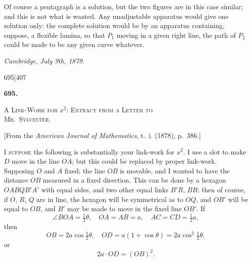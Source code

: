 \documentclass[11pt]{article}
\begin{document}
Of course a pentagraph is a solution, but the two figures are in this case similar; and this is not what is wanted. Any unadjustable apparatus would give one solution only: the complete solution would be by an apparatus containing, suppose, a flexible lamina, so that $P_{1}$ moving in a given right line, the path of $P_{2}$ could be made to be any given curve whatever.

\medskip
\noindent\textit{Cambridge, July 9th, 1879.}

\clearpage
\begin{center}\small 695]\hfill 407\end{center}

\bigskip
\begin{center}\textbf{\large 695.}\end{center}

\bigskip
\begin{center}\textsc{A Link-Work for $x^{2}$: Extract from a Letter to\\ Mr.~Sylvester.}\end{center}

\begin{center}\small [From the \textit{American Journal of Mathematics}, t.~i. (1878), p.~386.]\end{center}

I \textsc{suppose} the following is substantially your link-work for $x^{2}$. I use a slot to make $D$ move in the line $OA$; but this could be replaced by proper link-work. Supposing $O$ and $A$ fixed; the line $OB$ is movable, and I wanted to have the distance $OB$ measured in a fixed direction. This can be done by a hexagon $OABQB'A'$ with equal sides, and two other equal links $B'R$, $BR$: then of course, if $O$, $R$, $Q$ are in line, the hexagon will be symmetrical as to $OQ$, and $OB'$ will be equal to $OB$, and $B'$ may be made to move in the fixed line $OB'$. If
\[ \angle BOA = \tfrac{1}{2}\theta, \quad OA = AB = a, \quad AC = CD = \tfrac{1}{2}a, \]
then
\[ OB = 2a\cos\tfrac{1}{2}\theta, \quad OD = a(1 + \cos\theta) = 2a\cos^{2}\tfrac{1}{2}\theta, \]
or
\[ 2a \cdot OD = (OB)^{2}. \]
\end{document}
